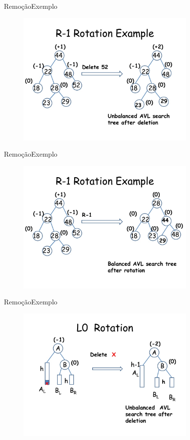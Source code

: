 \documentclass[aspectratio=169]{beamer}
\begin{document}
\begin{frame}{Remoção}{Exemplo}
\begin{figure}[!h]
  \centering
  \includegraphics[width=250pt]{imagens/exemplo_remocao11.png}
  \label{fig_exemplo_remocao11}
\end{figure}
\end{frame}

\begin{frame}{Remoção}{Exemplo}
\begin{figure}[!h]
  \centering
  \includegraphics[width=250pt]{imagens/exemplo_remocao12.png}
  \label{fig_exemplo_remocao12}
\end{figure}
\end{frame}


\begin{frame}{Remoção}{Exemplo}
\begin{figure}[!h]
  \centering
  \includegraphics[width=250pt]{imagens/exemplo_remocao13.png}
  \label{fig_exemplo_remocao13}
\end{figure}
\end{frame}
\end{document}
